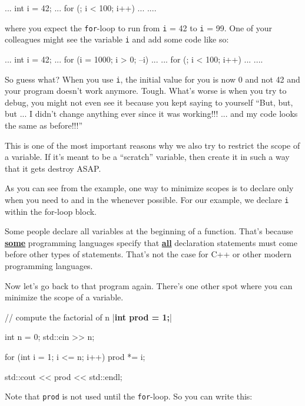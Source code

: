 \begin{console}
...
int i = 42;
...
for (; i < 100; i++)
{
    ...
}
.... 
\end{console}

where you expect the \texttt{for}-loop to run from \texttt{i} = 42 to \texttt{i} = 99. One of your colleagues might see the variable \texttt{i} and add some code like so:

\begin{console}
...
int i = 42;
...
for (i = 1000; i > 0; --i)
{    
     ...
}
...
for (; i < 100; i++)
{     
     ...
}
.... 
\end{console}

So guess what? When you use \texttt{i}, the initial value for you is now 0 and not 42 and your program doesn't work anymore. Tough. What's worse is when you try to debug, you might not even see it because you kept saying to yourself ``But, but, but ... I didn't change anything ever since it was working!!! ... and my code looks the same as before!!!''

This is one of the most important reasons why we also try to restrict the scope of a variable. If it's meant to be a ``scratch'' variable, then create it in such a way that it gets destroy ASAP.

As you can see from the example, one way to minimize scopes is to declare only when you need to and in the  whenever possible. For our example, we declare \texttt{i} within the for-loop block.

Some people declare all variables at the beginning of a function. That's because \underline{\textbf{some}} programming languages specify that \underline{\textbf{all}} declaration statements must come before other types of statements.
That's not the case for C++ or other modern programming languages.

Now let's go back to that program again. There's one other spot where you can minimize the scope of a variable.

\begin{consolethree}[escapeinside=||]
// compute the factorial of n
|\textbf{int prod = 1;}|

int n = 0;
std::cin >> n;

for (int i = 1; i <= n; i++)
{    
     prod *= i;
}

std::cout << prod << std::endl;
\end{consolethree}

Note that \texttt{prod} is not used until the \texttt{for}-loop. So you can
write this:

